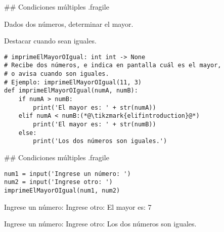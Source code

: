 ## Condiciones múltiples {.fragile}



\bgnblockgood[wd=.8\textwidth]

Dados dos números, determinar el mayor.

\alert{Destacar cuando sean iguales.}

\trmblockgood

\begin{lstlisting}[style=frame02]
# imprimeElMayorOIgual: int int -> None
# Recibe dos números, e indica en pantalla cuál es el mayor,
# o avisa cuando son iguales.
# Ejemplo: imprimeElMayorOIgual(11, 3)
def imprimeElMayorOIgual(numA, numB):
    if numA > numB:
        print('El mayor es: ' + str(numA))
    elif numA < numB:(*@\tikzmark{elifintroduction}@*)
        print('El mayor es: ' + str(numB))
    else:
        print('Los dos números son iguales.')
\end{lstlisting}


## Condiciones múltiples {.fragile}


\bgncolumns
{}
\vspace{-1ex}


\begin{lstlisting}
num1 = input('Ingrese un número: ')
num2 = input('Ingrese otro: ')
imprimeElMayorOIgual(num1, num2)
\end{lstlisting}

\vspace{-1ex}


\begin{exampleConsole}
Ingrese un número: 
Ingrese otro: 
El mayor es: 7
\end{exampleConsole}

\fullrule


\begin{exampleConsole}
Ingrese un número: 
Ingrese otro: 
Los dos números son iguales.
\end{exampleConsole}

